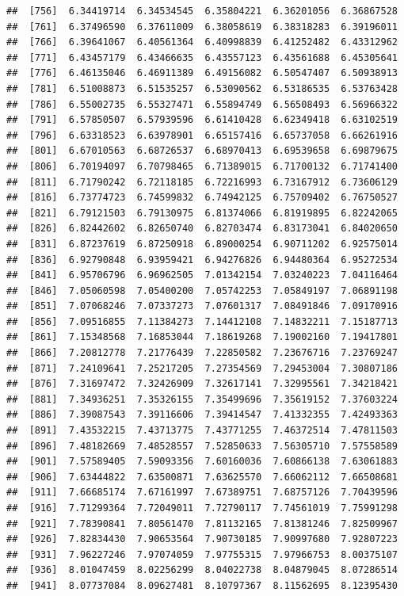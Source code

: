 \documentclass[
  11pt]{report}
\begin{document}
\begin{itemize}
\begin{verbatim}
##  [756]  6.34419714  6.34534545  6.35804221  6.36201056  6.36867528
##  [761]  6.37496590  6.37611009  6.38058619  6.38318283  6.39196011
##  [766]  6.39641067  6.40561364  6.40998839  6.41252482  6.43312962
##  [771]  6.43457179  6.43466635  6.43557123  6.43561688  6.45305641
##  [776]  6.46135046  6.46911389  6.49156082  6.50547407  6.50938913
##  [781]  6.51008873  6.51535257  6.53090562  6.53186535  6.53763428
##  [786]  6.55002735  6.55327471  6.55894749  6.56508493  6.56966322
##  [791]  6.57850507  6.57939596  6.61410428  6.62349418  6.63102519
##  [796]  6.63318523  6.63978901  6.65157416  6.65737058  6.66261916
##  [801]  6.67010563  6.68726537  6.68970413  6.69539658  6.69879675
##  [806]  6.70194097  6.70798465  6.71389015  6.71700132  6.71741400
##  [811]  6.71790242  6.72118185  6.72216993  6.73167912  6.73606129
##  [816]  6.73774723  6.74599832  6.74942125  6.75709402  6.76750527
##  [821]  6.79121503  6.79130975  6.81374066  6.81919895  6.82242065
##  [826]  6.82442602  6.82650740  6.82703474  6.83173041  6.84020650
##  [831]  6.87237619  6.87250918  6.89000254  6.90711202  6.92575014
##  [836]  6.92790848  6.93959421  6.94276826  6.94480364  6.95272534
##  [841]  6.95706796  6.96962505  7.01342154  7.03240223  7.04116464
##  [846]  7.05060598  7.05400200  7.05742253  7.05849197  7.06891198
##  [851]  7.07068246  7.07337273  7.07601317  7.08491846  7.09170916
##  [856]  7.09516855  7.11384273  7.14412108  7.14832211  7.15187713
##  [861]  7.15348568  7.16853044  7.18619268  7.19002160  7.19417801
##  [866]  7.20812778  7.21776439  7.22850582  7.23676716  7.23769247
##  [871]  7.24109641  7.25217205  7.27354569  7.29453004  7.30807186
##  [876]  7.31697472  7.32426909  7.32617141  7.32995561  7.34218421
##  [881]  7.34936251  7.35326155  7.35499696  7.35619152  7.37603224
##  [886]  7.39087543  7.39116606  7.39414547  7.41332355  7.42493363
##  [891]  7.43532215  7.43713775  7.43771255  7.46372514  7.47811503
##  [896]  7.48182669  7.48528557  7.52850633  7.56305710  7.57558589
##  [901]  7.57589405  7.59093356  7.60160036  7.60866138  7.63061883
##  [906]  7.63444822  7.63500871  7.63625570  7.66062112  7.66508681
##  [911]  7.66685174  7.67161997  7.67389751  7.68757126  7.70439596
##  [916]  7.71299364  7.72049011  7.72790117  7.74561019  7.75991298
##  [921]  7.78390841  7.80561470  7.81132165  7.81381246  7.82509967
##  [926]  7.82834430  7.90653564  7.90730185  7.90997680  7.92807223
##  [931]  7.96227246  7.97074059  7.97755315  7.97966753  8.00375107
##  [936]  8.01047459  8.02256299  8.04022738  8.04879045  8.07286514
##  [941]  8.07737084  8.09627481  8.10797367  8.11562695  8.12395430

\end{verbatim}
\end{itemize}
\end{document}
